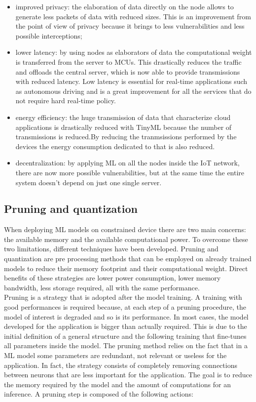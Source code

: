 \documentclass[12pt]{report}
\begin{document}
\begin{itemize}
\item improved privacy: the elaboration of data directly on the node allows to generate less packets of data with reduced sizes. This is an improvement from the point of view of privacy because it brings to less vulnerabilities and less possible interceptions;
\item lower latency: by using nodes as elaborators of data the computational weight is transferred from the server to MCUs. This drastically reduces the traffic and offloads the central server, which is now able to provide transmissions with reduced latency. Low latency is essential for real-time applications such as autonomous driving and is a great improvement for all the services that do not require hard real-time policy.
\item energy efficiency: the huge transmission of data that characterize cloud applications is drastically reduced with TinyML because the number of transmissions is reduced.By reducing the tranmsissions performed by the devices the energy consumption dedicated to that is also reduced.
\item decentralization: by applying ML on all the nodes inside the IoT network, there are now more possible vulnerabilities, but at the same time the entire system doesn't depend on just one single server. 
\end{itemize}



\subsection{Pruning and quantization}
When deploying ML models on constrained device there are two main concerns: the available memory and the available computational power. To overcome these two limitations, different techniques have been developed. Pruning and quantization are pre processing methods that can be employed on already trained models to reduce their memory footprint and their computational weight. Direct benefits of these strategies are lower power consumption, lower memory bandwidth, less storage required, all with the same performance. \\
Pruning is a strategy that is adopted after the model training. A training with good performances is required because, at each step of a pruning procedure, the model of interest is degraded and so is its performance. In most cases, the model developed for the application is bigger than actually required. This is due to the initial definition of a general structure and the following training that fine-tunes all parameters inside the model. The pruning method relies on the fact that in a ML model some parameters are redundant, not relevant or useless for the application. In fact, the strategy consists of completely removing connections between neurons that are less important for the application. The goal is to reduce the memory required by the model and the amount of computations for an inference. 
A pruning step is composed of the following actions:
\end{document}
